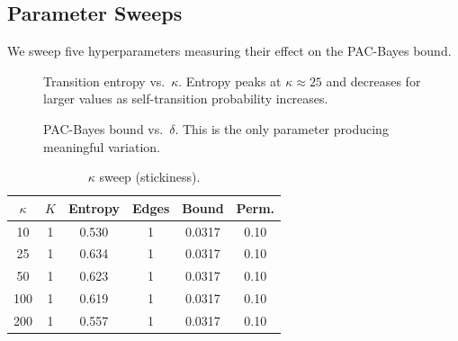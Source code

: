 \documentclass[11pt]{article}
\begin{document}
\subsection{Parameter Sweeps}

We sweep five hyperparameters measuring their effect on the PAC-Bayes
bound.

\begin{figure}[h]
\centering
{}
\caption{Transition entropy vs.\ $\kappa$.  Entropy peaks at
$\kappa \approx 25$ and decreases for larger values as
self-transition probability increases.}\label{fig:kappasweep}
\end{figure}

\begin{figure}[h]
\centering
{}
\caption{PAC-Bayes bound vs.\ $\delta$.  This is the only parameter
producing meaningful variation.}\label{fig:deltasweep}
\end{figure}

\begin{table}[h]
\centering
\caption{$\kappa$ sweep (stickiness).}\label{tab:kappa}
\small
\begin{tabular}{@{}cccccc@{}}
\toprule
$\kappa$ & $K$ & Entropy & Edges & Bound
  & Perm. \\
\midrule
10  & 1 & 0.530 & 1 & 0.0317 & 0.10 \\
25  & 1 & 0.634 & 1 & 0.0317 & 0.10 \\
50  & 1 & 0.623 & 1 & 0.0317 & 0.10 \\
100 & 1 & 0.619 & 1 & 0.0317 & 0.10 \\
200 & 1 & 0.557 & 1 & 0.0317 & 0.10 \\
\bottomrule
\end{tabular}
\end{table}
\end{document}
